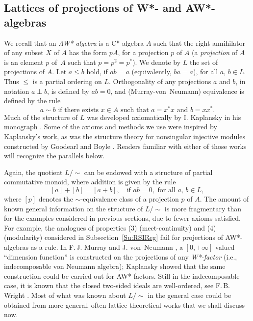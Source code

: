 \documentclass[psamsfonts,reqno]{memo-l}
\theoremstyle{plain}
\theoremstyle{definition}
\theoremstyle{remark}
\numberwithin{equation}{section}
\newcommand{\pcm}{partial commutative mon\-oid}
\begin{document}
\subsection{Lattices of projections of W*- and AW*-algebras}
\label{Su:ProjAW*}
We recall that an \emph{AW*-algebra}
is a C*-algebra $A$ such that the right annihilator of any subset $X$ of $A$
has the form $pA$, for a projection $p$ of $A$ (a \emph{projection} of $A$
is an element $p$ of~$A$ such that $p=p^2=p^*$). We denote by $L$ the set of
projections of $A$. Let $a\leq b$ hold, if $ab=a$ (equivalently, $ba=a$),
for all $a$, $b\in L$. Thus $\leq$ is a partial ordering on $L$.
Orthogonality of any projections $a$ and $b$, in notation
$a\perp b$, is defined by $ab=0$, and (Murray-von~Neumann) equivalence is
defined by the rule
   \[
   a\sim b\text{ if there exists }x\in A\text{ such that }a=x^*x\text{ and }
   b=xx^*.
   \]
Much of the structure of $L$ was developed axiomatically by I. Kaplansky
in his monograph \cite{Kapl68}. Some of the axioms and
methods we use were inspired by Kaplansky's work, as was the structure
theory for nonsingular injective modules constructed by Goodearl and Boyle
\cite{GoBo}.
%
Readers familiar with either of those works will recognize the parallels
below.

Again, the quotient $L/{\sim}$ can be endowed with a structure of
\pcm, where addition is given by the rule
   \[
   [a]+[b]=[a+b],\quad\text{if }ab=0,\text{ for all }a,\,b\in L,
   \]
where $[p]$ denotes the $\sim$-equivalence class of a projection $p$ of $A$.
The amount of known general information on the structure of $L/{\sim}$ is more
fragmentary than for the examples considered in previous sections, due to
fewer axioms satisfied. For example, the analogues of properties (3)
(meet-continuity) and (4) (modularity) considered in Subsection~\ref{Su:RSIReg}
fail for projections of AW*-algebras as a rule. In F.\,J.
Murray and J. von~Neumann \cite{MuNe36},
%
a $[0,+\infty]$-valued ``dimension function'' is
constructed on the projections of any \emph{W*-factor} (i.e.,
indecomposable von Neumann algebra);
Kaplansky showed that the same
construction could be carried out for AW*-factors. Still in the indecomposable
case, it is known that the closed two-sided ideals are well-ordered, see
F.\,B. Wright \cite{Wrig58}. Most of what was known
about $L/{\sim}$ in the general case could be obtained from more general,
often lattice-theoretical works that we shall discuss now.
\end{document}
